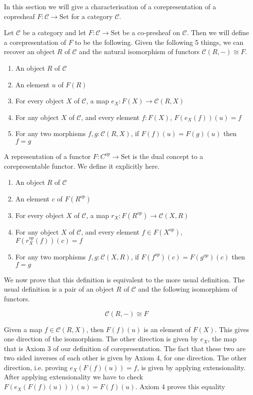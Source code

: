 \documentclass[12pt]{article} %
\theoremstyle{definition}
\theoremstyle{definition}
\theoremstyle{definition}
\theoremstyle{definition}
\begin{document}
In this section we will give a characterisation of a corepresentation
of a copresheaf $F : \mathcal{C} \to \text{Set}$ for a category $\mathcal{C}$.

Let $\mathcal{C}$ be a category and let $F : \mathcal{C} \to \text{Set}$
be a co-presheaf on $\mathcal{C}$. Then we will define a corepresentation of
$F$ to be the following. Given the following 5 things, we can recover an
object $R$ of $\mathcal{C}$ and the natural isomorphism
of functors $\mathcal{C}(R, -) \cong F$.

\begin{enumerate}
  \item An object $R$ of $\mathcal{C}$
  \item An element $u$ of $F(R)$
  \item For every object $X$ of $\mathcal{C}$, a map $e_X : F(X) \to \mathcal{C}(R, X)$
  \item For any object $X$ of $\mathcal{C}$, and every element $f : F(X)$, $F(e_X(f))(u) = f$
  \item For any two morphisms $f, g : \mathcal{C}(R, X)$, if $F(f)(u) = F(g)(u)$ then $f = g$
\end{enumerate}

A representation of a functor $F : C^{op} \to \text{Set}$ is the dual concept to a corepresentable
functor. We define it explicitly here.

\begin{enumerate}
  \item An object $R$ of $\mathcal{C}$
  \item An element $c$ of $F(R^{op})$
  \item For every object $X$ of $\mathcal{C}$, a map $r_X : F(R^{op}) \to \mathcal{C}(X, R)$
  \item For any object $X$ of $\mathcal{C}$, and every element $f \in F(X^{op})$, $F(r_X^{op}(f))(c) = f$
  \item For any two morphisms $f, g : \mathcal{C}(X, R)$, if $F(f^{op})(c) = F(g^{op})(c)$ then $f = g$
\end{enumerate}

We now prove that this definition is equivalent to the more usual definition.
The usual definition is a pair of an object $R$ of $\mathcal{C}$ and
the following isomorphism of functors.

\begin{equation}
\mathcal{C}(R, -) \cong F
\end{equation}

Given a map $f \in \mathcal{C}(R, X)$, then $F(f)(u)$ is an element of $F(X)$. This gives one
direction of the isomorphism. The other direction is given by $e_X$, the map that is
Axiom 3 of our definition of corepresentation. The fact that these two are two sided inverses
of each other is given by Axiom 4, for one direction. The other direction, i.e.
proving $e_X(F(f)(u)) = f$, is given by applying extensionality.
After applying extensionality we have to check $F(e_X(F(f)(u)))(u) = F(f)(u)$.
Axiom 4 proves this equality
\end{document}
